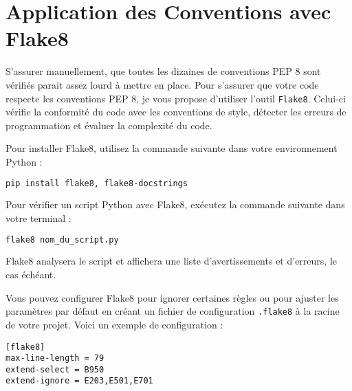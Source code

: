 \documentclass[a4paper,12pt]{article}
\begin{document}
\section{Application des Conventions avec Flake8}

S'assurer manuellement, que toutes les dizaines de conventions PEP 8 sont vérifiés parait assez lourd à mettre en place.  
Pour s'assurer que votre code respecte les conventions PEP 8, je vous propose d'utiliser l'outil \texttt{Flake8}. Celui-ci vérifie la conformité du code avec les conventions de style, détecter les erreurs de programmation et évaluer la complexité du code.

Pour installer Flake8, utilisez la commande suivante dans votre environnement Python :

\begin{lstlisting}[language=bash]
pip install flake8, flake8-docstrings
\end{lstlisting}

Pour vérifier un script Python avec Flake8, exécutez la commande suivante dans votre terminal :

\begin{lstlisting}[language=bash]
flake8 nom_du_script.py
\end{lstlisting}

Flake8 analysera le script et affichera une liste d'avertissements et d'erreurs, le cas échéant.


Vous pouvez configurer Flake8 pour ignorer certaines règles ou pour ajuster les paramètres par défaut en créant un fichier de configuration \texttt{.flake8} à la racine de votre projet. Voici un exemple de configuration :

\begin{lstlisting}
[flake8]
max-line-length = 79
extend-select = B950
extend-ignore = E203,E501,E701
\end{lstlisting}
\end{document}
